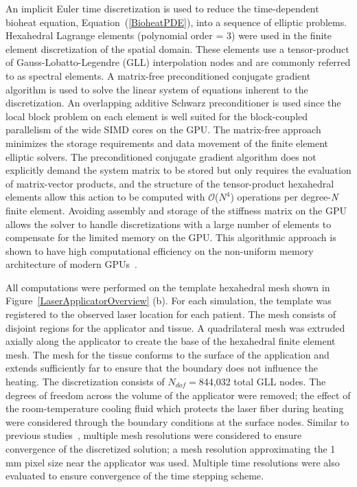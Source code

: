 \documentclass[12pt]{article}
\newcommand{\eqn}[1]{(\ref{#1})}
\begin{document}
An implicit Euler time discretization is used to reduce the 
time-dependent bioheat equation, Equation~\eqn{BioheatPDE}, into a sequence of elliptic problems. 
Hexahedral Lagrange elements (polynomial order = 3) were used in the finite
element discretization of the spatial domain.
These elements use a tensor-product of Gauss-Lobatto-Legendre (GLL) interpolation
nodes and are commonly referred to as spectral elements.  
A matrix-free preconditioned conjugate gradient algorithm is used to solve the
linear system of equations inherent to the discretization.  
An overlapping additive Schwarz preconditioner is used since the local
block problem on each element is well suited for the block-coupled
parallelism of the wide SIMD cores on the GPU.  
The matrix-free approach minimizes the storage
requirements and data movement of the finite element elliptic solvers.  The
preconditioned conjugate gradient algorithm does not explicitly demand the system
matrix to be stored but only requires the evaluation of matrix-vector products,
and the structure of the tensor-product hexahedral elements allow this action
to be computed with $\mathcal{O}$($N^4$) operations per degree-\textit{N} finite
element.  
Avoiding assembly and storage of the stiffness matrix on the GPU
allows the solver to handle discretizations with a large number of elements to
compensate for the limited memory on the GPU.  This algorithmic approach is
shown to have high computational efficiency on the non-uniform memory
architecture of modern GPUs~\cite{Medina2014}.

All computations were performed on the template hexahedral mesh
shown in Figure~\ref{LaserApplicatorOverview} (b).
For each simulation, the template was registered to the observed
laser location for each patient.
The mesh consists of disjoint regions for the applicator and tissue.
A quadrilateral mesh was extruded axially along the applicator to create
the base of the hexahedral finite element mesh. The mesh for the tissue
conforms to the surface of the application and extends sufficiently far
to ensure that the boundary does not influence the heating.
The discretization consists of $N_{dof}=$844,032 total GLL nodes. 
The degrees of freedom across the volume of the applicator were removed;
the effect of the room-temperature cooling fluid which protects the laser fiber
during heating were considered through the boundary conditions at the surface
nodes. 
{\color{red}
Similar to previous studies~\cite{fuentesetal11a}, multiple mesh resolutions
were considered to ensure convergence of the discretized solution;
a mesh resolution approximating the 1 mm pixel size near the applicator was used.
Multiple time resolutions were also evaluated to ensure convergence of the
time stepping scheme.
}
\end{document}
